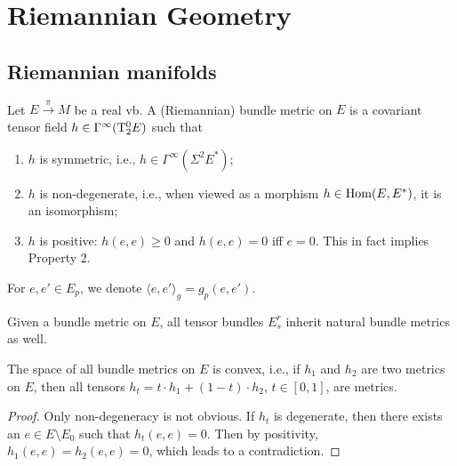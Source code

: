 
\clearpage
\chapter{Riemannian Geometry \texorpdfstring{\ucmark}{}}

\section{Riemannian manifolds}\label{sec: Riemannian mfds}


\begin{defn}
Let $E\overset\pi\to M$ be a real \gls{vb}. A (Riemannian) bundle metric on $E$ is a covariant tensor field $h\in\Gamma^\infty(\mathrm{T}^0_2 E)$ such that
\begin{enumerate}
    \item $h$ is symmetric, i.e., $h\in\Gamma^\infty(\Sigma^2 E^\ast)$;
    \item $h$ is non-degenerate, i.e., when viewed as a morphism $h\in\operatorname{Hom}(E,E^\ast)$, it is an isomorphism;
    \item $h$ is positive: $h(e,e)\geq 0$ and $h(e,e)=0$ iff $e=0$. This in fact implies Property 2.
\end{enumerate}
For $e,e'\in E_p$, we denote $\langle e,e'\rangle_g=g_p(e,e')$.
\end{defn}

Given a bundle metric on $E$, all tensor bundles $E^r_s$ inherit natural bundle metrics as well.

\begin{prop}
The space of all bundle metrics on $E$ is convex, i.e., if $h_1$ and $h_2$ are two metrics on $E$, then all tensors $h_t=t \cdot h_1+(1-t)\cdot h_2$, $t\in[0,1]$, are metrics.
\end{prop}
\begin{proof}
Only non-degeneracy is not obvious. If $h_t$ is degenerate, then there exists an $e\in E\setminus E_0$ such that $h_t(e,e)=0$. Then by positivity, $h_1(e,e)=h_2(e,e)=0$, which leads to a contradiction.
\end{proof}

